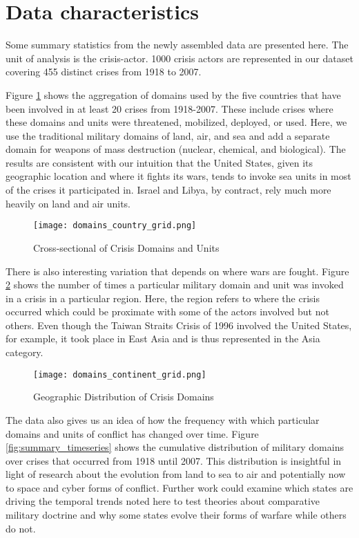 \documentclass[12pt,letterpaper]{article}
\begin{document}
\section{Data characteristics}
Some summary statistics from the newly assembled data are presented here. The unit of analysis is the crisis-actor. 1000 crisis actors are represented in our dataset covering 455 distinct crises from 1918 to 2007.

Figure \ref{fig:summary_crosssec} shows the aggregation of domains used by the five countries that have been involved in at least 20 crises from 1918-2007. These include crises where these domains and units were threatened, mobilized, deployed, or used. Here, we use the traditional military domains of land, air, and sea and add a separate domain for weapons of mass destruction (nuclear, chemical, and biological). The results are consistent with our intuition that the United States, given its geographic location and where it fights its wars, tends to invoke sea units in most of the crises it participated in. Israel and Libya, by contract, rely much more heavily on land and air units.

\begin{figure}[H]
	\centering
	\texttt{[image: domains\_country\_grid.png]}
	\caption{Cross-sectional of Crisis Domains and Units}
	\label{fig:summary_crosssec}
\end{figure}

There is also interesting variation that depends on where wars are fought. Figure \ref{fig:summary_region} shows the number of times a particular military domain and unit was invoked in a crisis in a particular region. Here, the region refers to where the crisis occurred which could be proximate with some of the actors involved but not others. Even though the Taiwan Straits Crisis of 1996 involved the United States, for example, it took place in East Asia and is thus represented in the Asia category.

\begin{figure}[H]
	\centering
	\texttt{[image: domains\_continent\_grid.png]}
	\caption{Geographic Distribution of Crisis Domains}
	\label{fig:summary_region}
\end{figure}

The data also gives us an idea of how the frequency with which particular domains and units of conflict has changed over time. Figure \ref{fig:summary_timeseries} shows the cumulative distribution of military domains over crises that occurred from 1918 until 2007. This distribution is insightful in light of research about the evolution from land to sea to air and potentially now to space and cyber forms of conflict. Further work could examine which states are driving the temporal trends noted here to test theories about comparative military doctrine and why some states evolve their forms of warfare while others do not.
\end{document}
